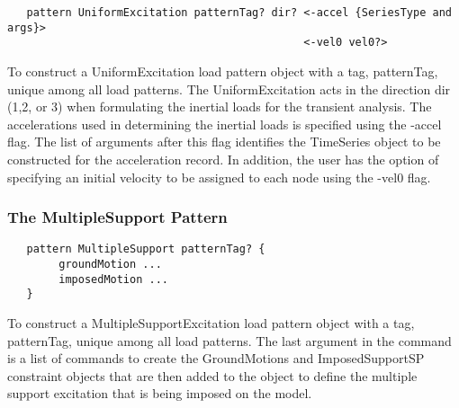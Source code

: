 \documentclass[12pt]{article}
\begin{document}
{\sf\small
\begin{verbatim}
   pattern UniformExcitation patternTag? dir? <-accel {SeriesType and args}> 
                                              <-vel0 vel0?>
\end{verbatim}
}

\noindent To construct a UniformExcitation load pattern object with a
tag, patternTag, unique among all load patterns. The UniformExcitation
acts in the direction dir (1,2, or 3) when formulating the inertial loads
for the transient analysis. The accelerations used in determining the
inertial loads is specified using the -accel flag. The list of
arguments after this flag identifies the TimeSeries object to be
constructed for the acceleration record. In addition, the user has the
option of specifying an initial velocity to be assigned to each node
using the -vel0 flag.

\subsubsection{The MultipleSupport Pattern}

{\sf\small
\begin{verbatim}
   pattern MultipleSupport patternTag? {
        groundMotion ...
        imposedMotion ...
   }	
\end{verbatim}
}


\noindent To construct a MultipleSupportExcitation load pattern object
with a tag, patternTag, unique among all load patterns. 
The last argument in the command is a list of commands to
create the GroundMotions and ImposedSupportSP constraint objects that
are then added to the object to define the multiple support excitation
that is being imposed on the model.


%

\end{document}
